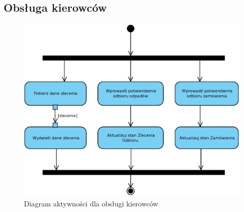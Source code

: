 \subsection{Obsługa kierowców}
	\begin{figure}[H]
		\centering
		\includegraphics[width=.9\textwidth]{img/AD/kierowca.eps}
		\caption{Diagram aktywności dla obsługi kierowców}
	\end{figure}